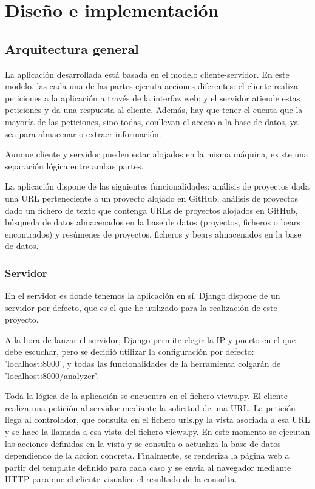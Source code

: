 \documentclass[a4paper, 12pt]{book}
\begin{document}
\cleardoublepage
\chapter{Diseño e implementación}

\section{Arquitectura general} 
\label{sec:seccion11}
La aplicación desarrollada está basada en el modelo cliente-servidor. En este modelo, las cada una de las partes ejecuta acciones diferentes: el cliente realiza peticiones a la aplicación a través de la interfaz web; y el servidor atiende estas peticiones y da una respuesta al cliente. Además, hay que tener el cuenta que la mayoría de las peticiones, sino todas, conllevan el acceso a la base de datos, ya sea para almacenar o extraer información.

Aunque cliente y servidor pueden estar alojados en la misma máquina, existe una separación lógica entre ambas partes.

La aplicación dispone de las siguientes funcionalidades: análisis de proyectos dada una URL perteneciente a un proyecto alojado en GitHub, análisis de proyectos dado un fichero de texto que contenga URLs de proyectos alojados en GitHub, búsqueda de datos almacenados en la base de datos (proyectos, ficheros o bears encontrados) y resúmenes de proyectos, ficheros y bears almacenados en la base de datos.

\subsection{Servidor}
\label{sec:seccion11.1}
En el servidor es donde tenemos la aplicación en sí. Django dispone de un servidor por defecto, que es el que he utilizado para la realización de este proyecto.

A la hora de lanzar el servidor, Django permite elegir la IP y puerto en el que debe escuchar, pero se decidió utilizar la configuración por defecto: 'localhost:8000', y todas las funcionalidades de la herramienta colgarán de 'localhost:8000/analyzer'.

Toda la lógica de la aplicación se encuentra en el fichero views.py. El cliente realiza una petición al servidor mediante la solicitud de una URL. La petición llega al controlador, que consulta en el fichero urls.py la vista asociada a esa URL y se hace la llamada a esa vista del fichero views.py. En este momento se ejecutan las acciones definidas en la vista y se consulta o actualiza la base de datos dependiendo de la accion concreta. Finalmente, se renderiza la página web a partir del template definido para cada caso y se envia al navegador mediante HTTP para que el cliente visualice el resultado de la consulta.
\end{document}
